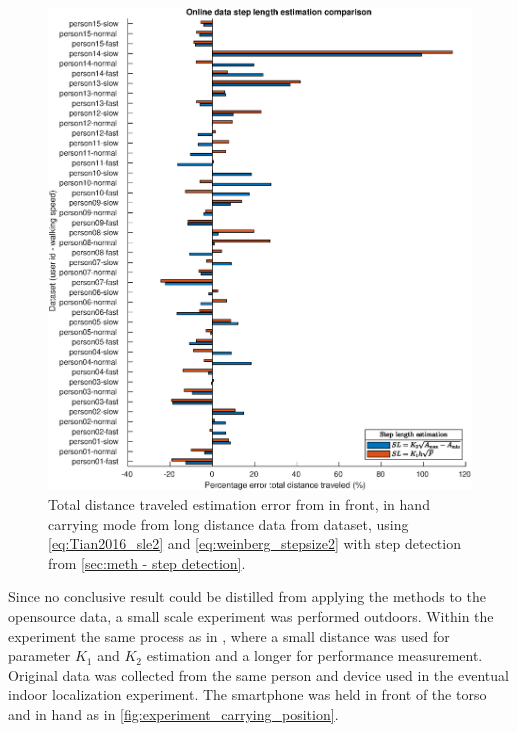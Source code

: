 \begin{figure}[]
	\centering
	\includegraphics[width=\linewidth]{images/20201128_1403_Online_data_step_length_estimation_comparison}
	\caption{Total distance traveled estimation error from in front, in hand carrying mode from long distance data from \citet{Vezocnik2019} dataset, using \eqref{eq:Tian2016_sle2} and \eqref{eq:weinberg_stepsize2} with step detection from \cref{sec:meth - step detection}. }
	\label{fig:202011131943_wienberg_vs_tian_vezocnik_data1}
\end{figure}
 
Since no conclusive result could be distilled from applying the methods to the opensource data, a small scale experiment was performed outdoors. Within the experiment the same process as in \cite{Vezocnik2019}, where a small distance was used for parameter $ K_1 $ and $ K_2 $ estimation and a longer for performance measurement. Original data was collected from the same person and device used in the eventual indoor localization experiment. The smartphone was held in front of the torso and in hand as in \cref{fig:experiment_carrying_position}. \par 

